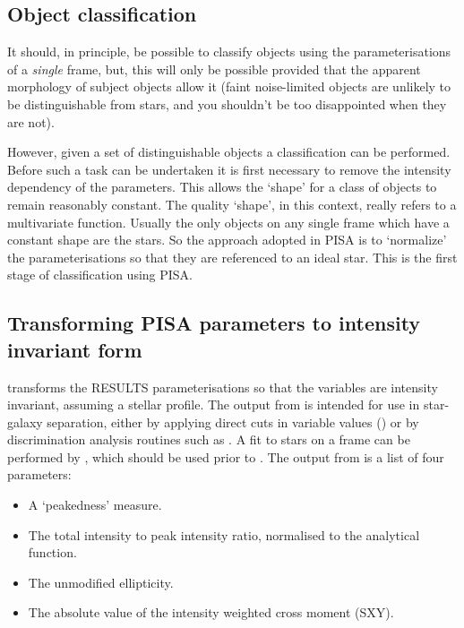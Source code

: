 \subsection{Object classification}

It should, in principle, be possible to classify objects using the
 parameterisations of a {\em single} frame, but, this will only
be possible provided that the apparent morphology of subject objects
allow it (faint noise-limited objects are unlikely to be distinguishable
from stars, and you shouldn't be too disappointed when they are not).

However, given a set of distinguishable objects a classification can be
performed. Before such a task can be undertaken it is first necessary to
remove the intensity dependency of the parameters. This allows the
`shape' for a class of objects to remain reasonably constant. The
quality `shape', in this context, really refers to a multivariate
function. Usually the only objects on any single frame which have a
constant shape are the stars. So the approach adopted in PISA is to
`normalize' the  parameterisations so that they are referenced
to an ideal star. This is the first stage of classification using PISA.

\subsection{Transforming PISA parameters to intensity invariant form}

 transforms the  RESULTS
parameterisations so that the variables are intensity invariant,
assuming a stellar profile. The output from  is
intended for use in star-galaxy separation, either by applying direct
cuts in variable values () or by discrimination analysis
routines such as . A fit to stars on a frame can be
performed by , which should be used prior to
. The output from  is a list of four
parameters:
\begin{itemize}
\item A `peakedness' measure.
\item The total intensity to peak intensity ratio, normalised to the
analytical function.
\item The unmodified ellipticity.
\item The absolute value of the intensity weighted cross moment (SXY).
\end{itemize}

